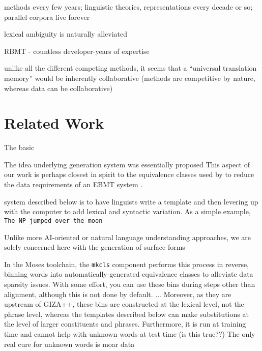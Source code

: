 methods every few years; linguistic theories, representations every decade or so; parallel corpora live forever

lexical ambiguity is naturally alleviated

RBMT - countless developer-years of expertise

unlike all the different competing methods, it seems that a ``universal translation memory'' would be inherently collaborative (methods are competitive by nature, whereas data can be collaborative)












\section{Related Work}
\label{sec:related}

The basic 

The idea underlying generation system was essentially proposed 
This aspect of our work is perhaps closest in spirit to the equivalence classes used by  to reduce the data requirements of an EBMT system .

system described below is to have linguists write a template and then levering up with the computer to add lexical and syntactic variation.  
As a simple example, 
{\small \tt The NP jumped over the moon}





Unlike more AI-oriented or natural language understanding approaches, we are solely concerned here with the generation of surface forms





In the Moses toolchain, the {\small \tt mkcls} component  performs this process in reverse, binning words into automatically-generated equivalence classes to alleviate data sparsity issues.
With some effort, you can use these bins during steps other than alignment, although this is not done by default.
...
Moreover, as they are upstream of GIZA++, these bins are constructed at the lexical level, not the phrase level, whereas the templates described below can make substitutions at the level of larger constituents and phrases.
Furthermore, it is run at training time and cannot help with unknown words at test time (is this true??)
The only real cure for unknown words is moar data


